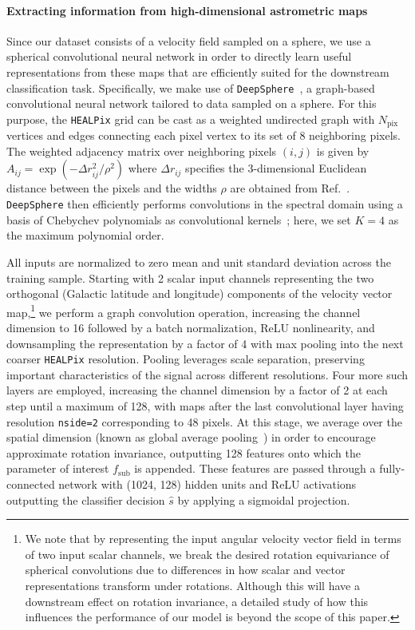 \documentclass[preprint]{article}
\begin{document}
\paragraph{Extracting information from high-dimensional astrometric maps} Since our dataset consists of a velocity field sampled on a sphere, we use a spherical convolutional neural network in order to directly learn useful representations from these maps that are efficiently suited for the downstream classification task. Specifically, we make use of \texttt{DeepSphere}~\cite{defferrard2020deepsphere,Perraudin:2018rbt}, a graph-based convolutional neural network tailored to data sampled on a sphere. For this purpose, the \texttt{HEALPix} grid can be cast as a weighted undirected graph with $N_\mathrm{pix}$ vertices and edges connecting each pixel vertex to its set of 8 neighboring pixels. The weighted adjacency matrix over neighboring pixels $(i, j)$ is given by $A_{ij} = \exp \left(-{\Delta r_{ij}^{2}}/{\rho^{2}}\right)$ where $\Delta r_{ij}$ specifies the 3-dimensional Euclidean distance between the pixels and the widths $\rho$ are obtained from Ref.~\cite{defferrard2020deepsphere}. \texttt{DeepSphere} then efficiently performs convolutions in the spectral domain using a basis of Chebychev polynomials as convolutional kernels~\cite{defferrard2016convolutional}; here, we set $K=4$ as the maximum polynomial order. 

All inputs are normalized to zero mean and unit standard deviation across the training sample. Starting with 2 scalar input channels representing the two orthogonal (Galactic latitude and longitude) components of the velocity vector map,\footnote{We note that by representing the input angular velocity vector field in terms of two input scalar channels, we break the desired rotation equivariance of spherical convolutions due to differences in how scalar and vector representations transform under rotations. Although this will have a downstream effect on rotation invariance, a detailed study of how this influences the performance of our model is beyond the scope of this paper.} we perform a graph convolution operation, increasing the channel dimension to 16 followed by a batch normalization, ReLU nonlinearity, and downsampling the representation by a factor of 4 with max pooling into the next coarser \texttt{HEALPix} resolution. Pooling leverages scale separation, preserving important characteristics of the signal across different resolutions. 
Four more such layers are employed, increasing the channel dimension by a factor of 2 at each step until a maximum of 128, with maps after the last convolutional layer having resolution \texttt{nside=2} corresponding to 48 pixels. At this stage, we average over the spatial dimension (known as global average pooling~\cite{lin2014network}) in order to encourage approximate rotation invariance, outputting 128 features onto which the parameter of interest $f_\mathrm{sub}$ is appended. These features are passed through a fully-connected network with (1024, 128) hidden units and ReLU activations outputting the classifier decision $\hat s$ by applying a sigmoidal projection.
\end{document}
